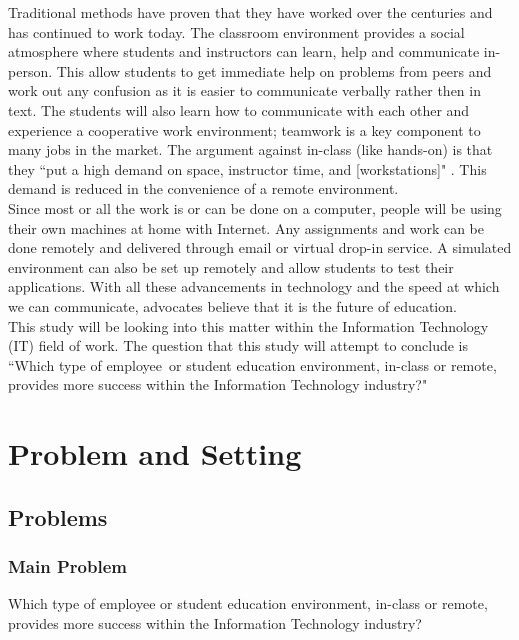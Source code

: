\documentclass[titlepage]{article}
\begin{document}
\noindent Traditional methods have proven that they have worked over the centuries and has continued to
work today.  The classroom environment provides a social atmosphere where students and instructors
can learn, help and communicate in-person.  This allow students to get immediate help on problems
from peers and work out any confusion as it is easier to communicate verbally rather then in text.
The students will also learn how to communicate with each other and experience a cooperative work
environment; teamwork is a key component to many jobs in the market.  The argument against in-class
(like hands-on) is that they ``put a high demand on space, instructor time, and [workstations]" \cite{2}.
This demand is reduced in the convenience of a remote environment.\\

\noindent Since most or all the work is or can be done on a computer, people will be using
their own machines at home with Internet.  Any assignments and work can be done remotely
and delivered through email or virtual drop-in service.  A simulated environment can also be
set up remotely and allow students to test their applications.  With all these advancements
in technology and the speed at which we can communicate, advocates believe that it is the
future of education. \\

\noindent This study will be looking into this matter within the Information Technology (IT) field
of work.  The question that this study will attempt to conclude is ``Which type of employee\
or student education environment, in-class or remote, provides more success within the
Information Technology industry?"

\clearpage

\section{Problem and Setting}

\subsection{Problems}

\subsubsection{Main Problem}
Which type of employee or student education environment, in-class or remote, provides
more success within the Information Technology industry?
\end{document}

